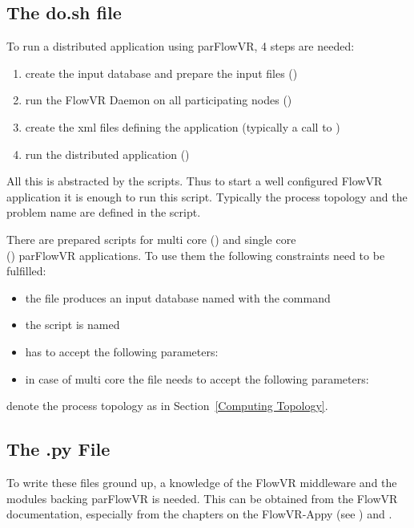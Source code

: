\subsection{The do.sh file}
To run a distributed application using parFlowVR, 4 steps are needed:
\begin{enumerate}
\item create the \parflow{} input database and prepare the input files ()
\item run the FlowVR Daemon on all participating nodes ()
\item create the xml files defining the application (typically a call to )
\item run the distributed application ()
\end{enumerate}
All this is abstracted by the  scripts.
Thus to start a well configured FlowVR application it is enough to run this script.
Typically the process topology and the \parflow{} problem name are defined in the  script.

There are prepared scripts for multi core ()
and single core \\() parFlowVR applications.
To use them the following constraints need to be fulfilled:
\begin{itemize}
\item the  file produces an input database named
   with the  command
\item the  script is named 
\item {} has to
  accept the following parameters: 
\item in case of multi core the  file needs to accept the following parameters:
\end{itemize}
   denote the process topology as in Section~\ref{Computing Topology}.
\subsection{The .py File}
To write these files ground up, a knowledge of the FlowVR middleware and the modules backing
parFlowVR is needed. This can be obtained from the FlowVR documentation, especially from
the chapters on the FlowVR-Appy (see )
and \cite{thesisFriedemann2018}.

